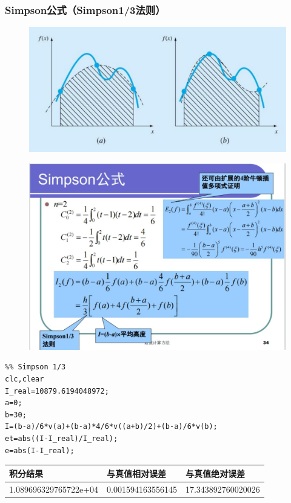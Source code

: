 \documentclass[a4paper,12pt]{ctexart}
\begin{document}
\subsubsection{Simpson公式（Simpson1/3法则）}
\begin{figure}[H]
    \centering
    \includegraphics[width=14cm]{第五章作业/simpson1.jpg}
\end{figure}
\begin{figure}[H]
    \centering
    \includegraphics[width=14cm]{第五章作业/simpson2.jpg}
\end{figure}
\begin{lstlisting}
%% Simpson 1/3
clc,clear
I_real=10879.6194048972;
a=0;
b=30;
I=(b-a)/6*v(a)+(b-a)*4/6*v((a+b)/2)+(b-a)/6*v(b);
et=abs((I-I_real)/I_real);
e=abs(I-I_real);
\end{lstlisting}
\begin{table}[H]
    \centering
    \begin{tabular}{lll}
        \hline
        积分结果              & 与真值相对误差    & 与真值绝对误差     \\ \hline
        1.089696329765722e+04 & 0.001594163556145 & 17.343892760020026 \\ \hline
    \end{tabular}
\end{table}
\end{document}
